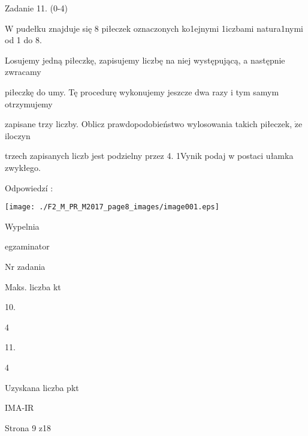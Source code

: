 \documentclass[a4paper,12pt]{article}
\begin{document}
Zadanie 11. (0-4)

$\mathrm{W}$ pudełku znajduje się 8 piłeczek oznaczonych ko1ejnymi 1iczbami natura1nymi od 1 do 8.

Losujemy jedną piłeczkę, zapisujemy liczbę na niej występującą, a następnie zwracamy

piłeczkę do umy. Tę procedurę wykonujemy jeszcze dwa razy i tym samym otrzymujemy

zapisane trzy liczby. Oblicz prawdopodobieństwo wylosowania takich piłeczek, $\dot{\mathrm{z}}\mathrm{e}$ iloczyn

trzech zapisanych liczb jest podzielny przez 4. 1Vynik podaj w postaci ułamka zwykłego.

Odpowiedzí :
\begin{center}
\texttt{[image: ./F2\_M\_PR\_M2017\_page8\_images/image001.eps]}
\end{center}
Wypelnia

egzaminator

Nr zadania

Maks. liczba kt

10.

4

11.

4

Uzyskana liczba pkt

IMA-IR

Strona 9 z18
\end{document}
